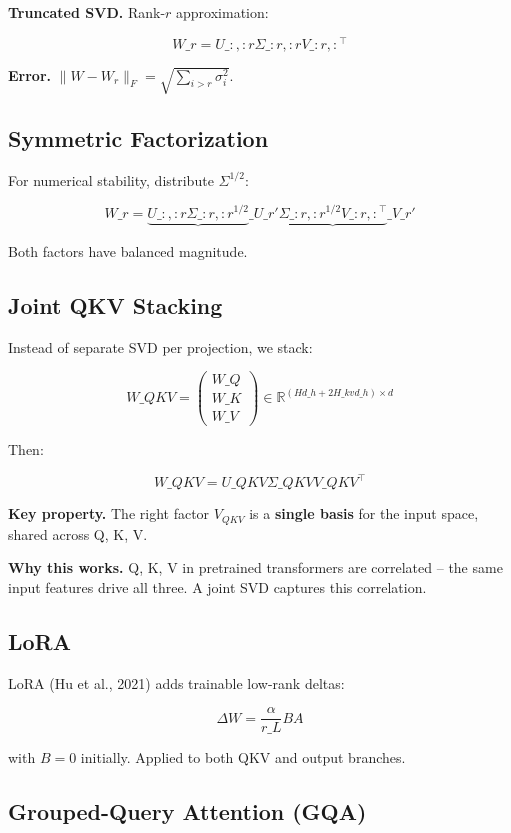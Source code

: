 \textbf{Truncated SVD.} Rank-$r$ approximation:

\[
W\_r = U\_{:, :r} \Sigma\_{:r, :r} V\_{:r, :}^\top
\]

\textbf{Error.} $\|W - W_r\|_F = \sqrt{\sum_{i > r} \sigma_i^2}$.

\subsection{Symmetric Factorization}

For numerical stability, distribute $\Sigma^{1/2}$:

\[
W\_r = \underbrace{U\_{:, :r} \Sigma\_{:r, :r}^{1/2}}\_{U\_r'} \underbrace{\Sigma\_{:r, :r}^{1/2} V\_{:r, :}^\top}\_{V\_r'}
\]

Both factors have balanced magnitude.

\subsection{Joint QKV Stacking}

Instead of separate SVD per projection, we stack:

\[
W\_{QKV} = \begin{pmatrix} W\_Q \\ W\_K \\ W\_V \end{pmatrix} \in \mathbb{R}^{(H d\_h + 2 H\_{kv} d\_h) \times d}
\]

Then:

\[
W\_{QKV} = U\_{QKV} \Sigma\_{QKV} V\_{QKV}^\top
\]

\textbf{Key property.} The right factor $V_{QKV}$ is a \textbf{single basis} for the 
input space, shared across Q, K, V.

\textbf{Why this works.} Q, K, V in pretrained transformers are correlated -- the 
same input features drive all three. A joint SVD captures this correlation.

\subsection{LoRA}

LoRA (Hu et al., 2021) adds trainable low-rank deltas:

\[
\Delta W = \frac{\alpha}{r\_L} B A
\]

with $B = 0$ initially. Applied to both QKV and output branches.

\subsection{Grouped-Query Attention (GQA)}

